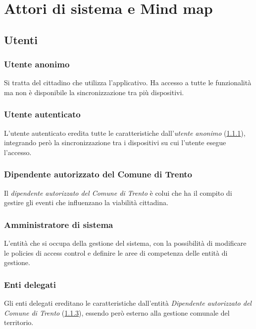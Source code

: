 \documentclass{article}
\begin{document}
\section{Attori di sistema e Mind map}

\subsection{Utenti}

\subsubsection{Utente anonimo}\label{Attori_UtenteAnonimo}
\label{3.1.1}
Si tratta del cittadino che utilizza l'applicativo. Ha accesso a tutte le funzionalità ma non è disponibile la sincronizzazione tra più dispositivi.

\subsubsection{Utente autenticato}
\label{3.1.2}
L'utente autenticato eredita tutte le caratteristiche dall'\textit{utente anonimo} (\ref{Attori_UtenteAnonimo}), integrando però la sincronizzazione tra i dispositivi su cui l'utente esegue l'accesso.

\subsubsection{Dipendente autorizzato del Comune di Trento}\label{Attori_DipendenteAutorizzato}
\label{3.1.3}
Il \textit{dipendente autorizzato del Comune di Trento} è colui che ha il compito di gestire gli eventi che influenzano la viabilità cittadina.

\subsubsection{Amministratore di sistema}
\label{3.1.4}
L'entità che si occupa della gestione del sistema, con la possibilità di modificare le policies di access control e definire le aree di competenza delle entità di gestione.

\subsubsection{Enti delegati}
\label{3.2.1}
Gli enti delegati ereditano le caratteristiche dall'entità \textit{Dipendente autorizzato del Comune di Trento} (\ref{Attori_DipendenteAutorizzato}), essendo però esterno alla gestione comunale del territorio.
\end{document}
